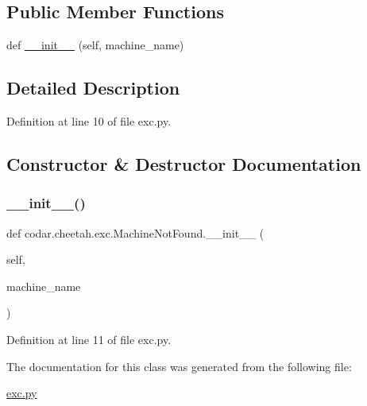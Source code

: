 \subsection*{Public Member Functions}
\begin{DoxyCompactItemize}
\item 
def \hyperlink{classcodar_1_1cheetah_1_1exc_1_1_machine_not_found_ae688c3fce79910a0bd7cd1e553be32cf}{\+\_\+\+\_\+init\+\_\+\+\_\+} (self, machine\+\_\+name)
\end{DoxyCompactItemize}


\subsection{Detailed Description}


Definition at line 10 of file exc.\+py.



\subsection{Constructor \& Destructor Documentation}
\mbox{\label{classcodar_1_1cheetah_1_1exc_1_1_machine_not_found_ae688c3fce79910a0bd7cd1e553be32cf}} 
\subsubsection{\texorpdfstring{\+\_\+\+\_\+init\+\_\+\+\_\+()}{\_\_init\_\_()}}
{\footnotesize\ttfamily def codar.\+cheetah.\+exc.\+Machine\+Not\+Found.\+\_\+\+\_\+init\+\_\+\+\_\+ (\begin{DoxyParamCaption}\item[{}]{self,  }\item[{}]{machine\+\_\+name }\end{DoxyParamCaption})}



Definition at line 11 of file exc.\+py.



The documentation for this class was generated from the following file\+:\begin{DoxyCompactItemize}
\item 
\hyperlink{exc_8py}{exc.\+py}\end{DoxyCompactItemize}
